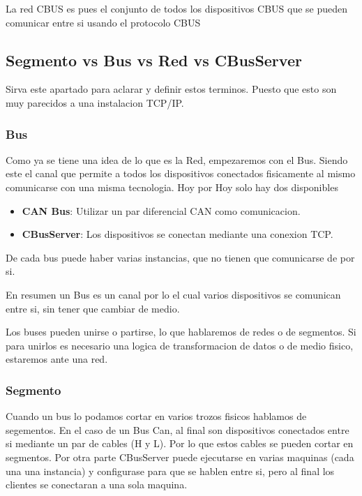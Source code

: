 La red CBUS es pues el conjunto de todos los dispositivos CBUS que se pueden comunicar entre si
usando el protocolo CBUS

\subsection{Segmento vs Bus vs Red vs CBusServer}
Sirva este apartado para aclarar y definir estos terminos. Puesto que esto son muy parecidos a una instalacion
TCP/IP.

\subsubsection{Bus}
Como ya se tiene una idea de lo que es la Red, empezaremos con el Bus. Siendo este el canal que permite
a todos los dispositivos conectados fisicamente al mismo comunicarse con una misma tecnologia. Hoy por Hoy solo hay dos disponibles
\begin{itemize}
    \item \textbf{CAN Bus}: Utilizar un par diferencial CAN como comunicacion.
    \item \textbf{CBusServer}: Los dispositivos se conectan mediante una conexion TCP.

\end{itemize}

De cada bus puede haber varias instancias, que no tienen que comunicarse de por si.

En resumen un Bus es un canal por lo el cual varios dispositivos se comunican entre si, sin tener que cambiar de medio.

Los buses pueden unirse o partirse, lo que hablaremos de redes o de segmentos.
Si para unirlos  es necesario una logica de transformacion de datos o de medio fisico, estaremos ante una red.

\subsubsection{Segmento}
Cuando un bus lo podamos cortar en varios trozos fisicos hablamos de segementos. En el caso de un Bus Can,
al final son dispositivos conectados entre si mediante un par de cables (H y L). Por lo que estos cables se pueden cortar en segmentos. Por otra parte CBusServer puede ejecutarse en varias maquinas (cada una una instancia) y configurase para que se hablen entre si, pero al final los clientes se conectaran a una sola maquina.

